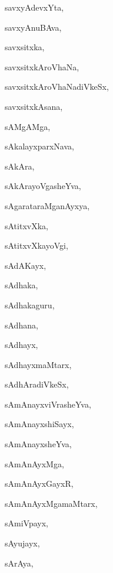 \begin{multicols}{3}
{\noindent
{savxyAdevxYta}, \pageref{savxyAdevxYta}

\noindent
{savxyAnuBAva}, \pageref{savxyAnuBAva}

\noindent
{savxsitxka}, \pageref{savxsitxka}

\noindent
{savxsitxkAroVhaNa}, \pageref{savxsitxkAroVhaNa}

\noindent
{savxsitxkAroVhaNadiVkeSx}, \pageref{savxsitxkAroVhaNadiVkeSx}

\noindent
{savxsitxkAsana}, \pageref{savxsitxkAsana}

\noindent
{sAMgAMga}, \pageref{sAMgAMga}

\noindent
{sAkalayxparxNava}, \pageref{sAkalayxparxNava}

\noindent
{sAkAra}, \pageref{sAkAra}

\noindent
{sAkArayoVgasheYva}, \pageref{sAkArayoVgasheYva}

\noindent
{sAgarataraMganAyxya}, \pageref{sAgarataraMganAyxya}

\noindent
{sAtitxvXka}, \pageref{sAtitxvXka}

\noindent
{sAtitxvXkayoVgi}, \pageref{sAtitxvXkayoVgi}

\noindent
{sAdAKayx}, \pageref{sAdAKayx}

\noindent
{sAdhaka}, \pageref{sAdhaka}

\noindent
{sAdhakaguru}, \pageref{sAdhakaguru}

\noindent
{sAdhana}, \pageref{sAdhana}

\noindent
{sAdhayx}, \pageref{sAdhayx}

\noindent
{sAdhayxmaMtarx}, \pageref{sAdhayxmaMtarx}

\noindent
{sAdhAradiVkeSx}, \pageref{sAdhAradiVkeSx}

\noindent
{sAmAnayxviVrasheYva}, \pageref{sAmAnayxviVrasheYva}

\noindent
{sAmAnayxshiSayx}, \pageref{sAmAnayxshiSayx}

\noindent
{sAmAnayxsheYva}, \pageref{sAmAnayxsheYva}

\noindent
{sAmAnAyxMga}, \pageref{sAmAnAyxMga}

\noindent
{sAmAnAyxGayxR}, \pageref{sAmAnAyxGayxR}

\noindent
{sAmAnAyxMgamaMtarx}, \pageref{sAmAnAyxMgamaMtarx}

\noindent
{sAmiVpayx}, \pageref{sAmiVpayx}

\noindent
{sAyujayx}, \pageref{sAyujayx}

\noindent
{sArAya}, \pageref{sArAya}

}
\end{multicols}

